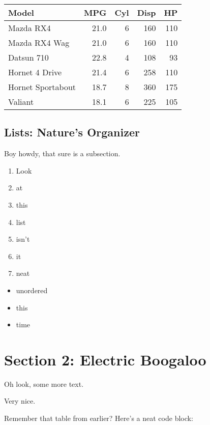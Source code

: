 \documentclass[
]{article}
\providecommand{\tightlist}{%
  \setlength{\itemsep}{0pt}\setlength{\parskip}{0pt}}
\begin{document}
\begin{longtable}[]{@{}lrrrr@{}}
\toprule()
Model & MPG & Cyl & Disp & HP \\
\midrule()
\endhead
Mazda RX4 & 21.0 & 6 & 160 & 110 \\
Mazda RX4 Wag & 21.0 & 6 & 160 & 110 \\
Datsun 710 & 22.8 & 4 & 108 & 93 \\
Hornet 4 Drive & 21.4 & 6 & 258 & 110 \\
Hornet Sportabout & 18.7 & 8 & 360 & 175 \\
Valiant & 18.1 & 6 & 225 & 105 \\
\bottomrule()
\end{longtable}

\hypertarget{lists-natures-organizer}{%
\subsection{Lists: Nature's Organizer}\label{lists-natures-organizer}}

Boy howdy, that sure is a subsection.

\begin{enumerate}
\def\labelenumi{\arabic{enumi}.}
\setcounter{enumi}{-1}
\tightlist
\item
  Look
\item
  at
\item
  this
\item
  list
\item
  isn't
\item
  it
\item
  neat
\end{enumerate}

\begin{itemize}
\tightlist
\item
  unordered
\item
  this
\item
  time
\end{itemize}

\hypertarget{section-2-electric-boogaloo}{%
\section{Section 2: Electric
Boogaloo}\label{section-2-electric-boogaloo}}

Oh look, some more text.

Very nice.

Remember that table from earlier? Here's a neat code block:
\end{document}
